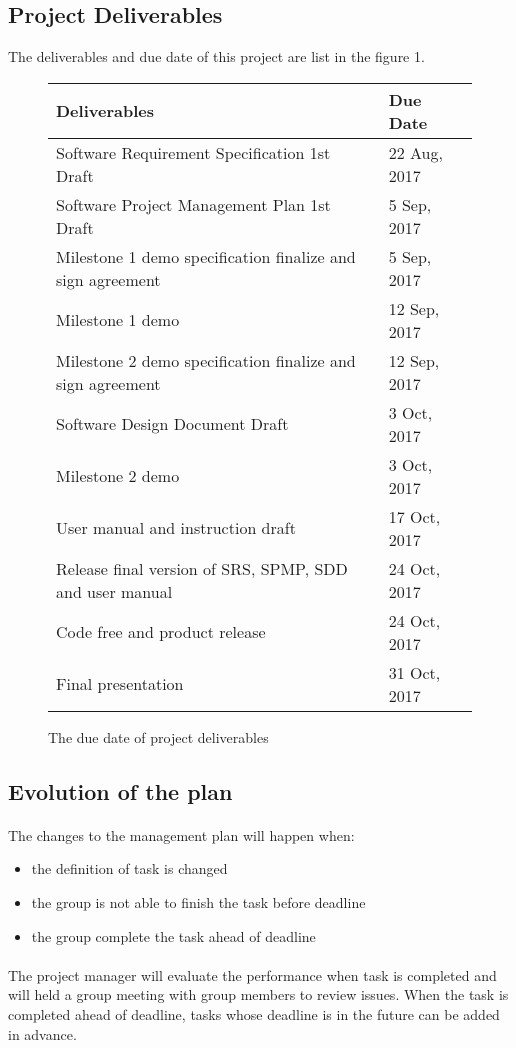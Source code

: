 \documentclass[11pt, a4paper]{article}
\begin{document}
	\subsection{Project Deliverables}
	The deliverables and due date of this project are list in the figure 1.
		\begin{figure}
		\centering
		\begin{tabular}{|p{8cm}|p{3cm}|}
	
			\hline 
			\textbf{Deliverables} &\textbf{Due Date} \\ 
			\hline 
				Software Requirement Specification 1st Draft & 22 Aug, 2017\\ 
			\hline 
				Software Project Management Plan 1st Draft & 5 Sep, 2017  \\ 
			\hline 		
				Milestone 1 demo specification finalize and sign agreement & 5 Sep, 2017 \\ 
			\hline 
				Milestone 1 demo & 12 Sep, 2017\\ 
			\hline 
				Milestone 2 demo specification finalize and sign agreement & 12 Sep, 2017 \\ 
			\hline 
				Software Design Document Draft & 3 Oct, 2017\\ 
			\hline 
				Milestone 2 demo & 3 Oct, 2017\\ 
			\hline 		
				User manual and instruction draft & 17 Oct, 2017\\ 
			\hline 
				Release final version of SRS, SPMP, SDD and user manual & 24 Oct, 2017\\ 
			\hline 
				Code free and product release & 24 Oct, 2017\\ 
			\hline 
				Final presentation & 31 Oct, 2017\\
			\hline
		\end{tabular} 
		\caption{The due date of project deliverables}
		\label{fig:tab Os Requirements}			
		\end{figure}

	\subsection{Evolution of the plan}
		\paragraph{}
	The changes to the management plan will happen when:
	\begin{itemize}
		\item the definition of task is changed
		\item the group is not able to finish the task before deadline
		\item the group complete the task ahead of deadline		
	\end{itemize}
	\paragraph{}
	The project manager will evaluate the performance when task is completed and will held a group meeting with group members to review issues. When the task is completed ahead of deadline, tasks whose deadline is in the future can be added in advance.

	
	
	
	
	



	
\end{document}

